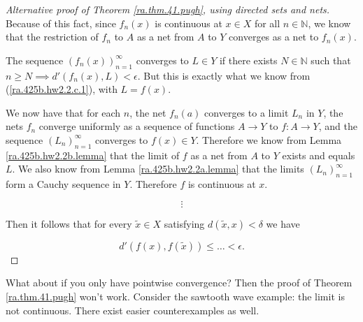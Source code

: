 \begin{proof}[Alternative proof of Theorem \ref{ra.thm.41.pugh}, using directed sets and nets]
Because of this fact, since \(f_n(x)\) is continuous at \(x \in X\) for all \(n \in \mathbb{N}\), we know that the restriction of \(f_n\) to \(A\) as a net from \(A\) to \(Y\) converges as a net to \(f_n(x)\).

The sequence \((f_n(x))_{n=1}^\infty\) converges to \(L \in Y\) if there exists \(N \in \mathbb{N}\) such that \(n \geq N \implies d'(f_n(x), L) < \epsilon\). But this is exactly what we know from (\ref{ra.425b.hw2.2.c.1}), with \(L = f(x)\).
 
We now have that for each \(n\), the net \(f_n(a)\) converges to a limit \(L_n\) in \(Y\), the nets \(f_n\) converge uniformly as a sequence of functions \(A \to Y\) to \(f: A \to Y\), and the sequence \((L_n)_{n=1}^\infty\) converges to \(f(x) \in Y\). Therefore we know from Lemma \ref{ra.425b.hw2.2b.lemma} that the limit of \(f\) as a net from \(A\) to \(Y\) exists and equals \(L\). We also know from Lemma \ref{ra.425b.hw2.2a.lemma} that the limits \((L_n)_{n=1}^\infty\) form a Cauchy sequence in \(Y\). Therefore \(f\) is continuous at \(x\).

%
%
%
%

\[
\vdots
\]


Then it follows that for every \(\tilde{x} \in X\) satisfying \(d(\tilde{x}, x) < \delta\) we have 

\[
d'(f(x), f(\tilde{x}))  \leq \ldots < \epsilon.
\]


\end{proof}

What about if you only have pointwise convergence? Then the proof of Theorem \ref{ra.thm.41.pugh} won't work. Consider the sawtooth wave example: the limit is not continuous. There exist easier counterexamples as well.

